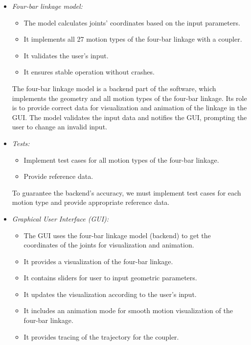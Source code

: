 \documentclass{article}
\begin{document}
\begin{itemize}
	\item \textit{Four-bar linkage model:}
	\begin{itemize}
		\item The model calculates joints' coordinates based on the input parameters.
		\item It implements all 27 motion types of the four-bar linkage with a coupler.
		\item It validates the user's input.
		\item It ensures stable operation without crashes.
	\end{itemize}
	
	The four-bar linkage model is a backend part of the software, which implements the geometry and all motion types of the four-bar linkage. Its role is to provide correct data for visualization and animation of the linkage in the GUI. The model validates the input data and notifies the GUI, prompting the user to change an invalid input.
	
	\item \textit{Tests:}
	\begin{itemize}
		\item Implement test cases for all motion types of the four-bar linkage.
		\item Provide reference data.
	\end{itemize}
	
	To guarantee the backend's accuracy, we must implement test cases for each motion type and provide appropriate reference data.
	
	\item \textit{Graphical User Interface (GUI):}
	\begin{itemize}
		\item The GUI uses the four-bar linkage model (backend) to get the coordinates of the joints for visualization and animation.
		\item It provides a visualization of the four-bar linkage.
		\item It contains sliders for user to input geometric parameters.
		\item It updates the visualization according to the user's input.
		\item It includes an animation mode for smooth motion visualization of the four-bar linkage.
		\item It provides tracing of the trajectory for the coupler.
	\end{itemize}
	

\end{itemize}
\end{document}
